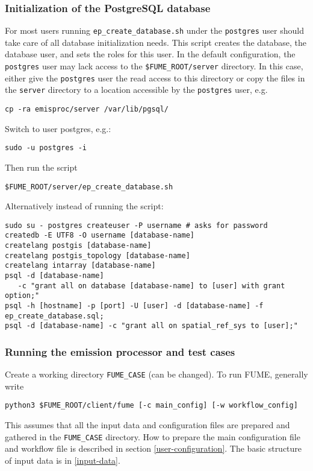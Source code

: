 \documentclass[a4paper,11pt]{article}
\begin{document}
\subsubsection{Initialization of the PostgreSQL database}
For most users running \verb|ep_create_database.sh| under the \verb|postgres| user should take care of all database initialization needs. This script creates the database, the database user, and sets the roles for this user. In the default configuration, the \verb|postgres| user may lack access to the \verb|$FUME_ROOT/server| directory. In this case, either give the \verb|postgres| user the read access to this directory or copy the files in the \verb|server| directory to a location accessible by the \verb|postgres| user, e.g.
\begin{verbatim}
cp -ra emisproc/server /var/lib/pgsql/
\end{verbatim}
Switch to user postgres, e.g.:
\begin{verbatim}
sudo -u postgres -i
\end{verbatim}
Then run the script
\begin{verbatim}
$FUME_ROOT/server/ep_create_database.sh
\end{verbatim}

Alternatively instead of running the script:
\begin{verbatim}
sudo su - postgres createuser -P username # asks for password
createdb -E UTF8 -O username [database-name]
createlang postgis [database-name] 
createlang postgis_topology [database-name]
createlang intarray [database-name] 
psql -d [database-name] 
   -c "grant all on database [database-name] to [user] with grant option;" 
psql -h [hostname] -p [port] -U [user] -d [database-name] -f ep_create_database.sql;
psql -d [database-name] -c "grant all on spatial_ref_sys to [user];"
\end{verbatim}

\subsubsection{Running the emission processor and test cases}
Create a working directory \verb|FUME_CASE| (can be changed). 
To run FUME, generally write
\begin{verbatim}
python3 $FUME_ROOT/client/fume [-c main_config] [-w workflow_config]
\end{verbatim}
This assumes that all the input data and configuration files are prepared and gathered in the \verb|FUME_CASE| directory. How to prepare the main configuration file and workflow file is described in section \ref{user-configuration}. The basic structure of input data is in \ref{input-data}.
\end{document}

